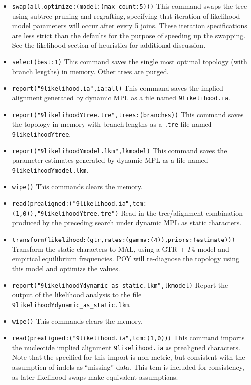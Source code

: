 \begin{itemize}
\item \texttt{swap(all,optimize:(model:(max\_count:5)))} This command swaps the tree using subtree pruning and 
regrafting, specifying that iteration of likelihood model parameters will occur after every 5 joins. These iteration 
specifications are less strict than the defaults for the purpose of speeding up the swapping. See the likelihood section
of heuristics for additional discussion. 
\item \texttt{select(best:1)} This command saves the single most optimal topology (with branch lengths) in 
memory. Other trees are purged.
\item \texttt{report("9likelihood.ia",ia:all)} This command saves the implied
    alignment generated by dynamic MPL as a file named \texttt{9likelihood.ia}.
\item \texttt{report("9likelihoodYtree.tre",trees:(branches))} This command saves the topology in memory with 
branch lengths as a \texttt{.tre} file named \texttt{9likelihoodYtree}.
\item \texttt{report("9likelihoodYmodel.lkm",lkmodel)} This command saves the parameter estimates generated 
by dynamic MPL as a file named \texttt{9likelihoodYmodel.lkm}.
\item \texttt{wipe()} This commands clears the memory.
\item \texttt{read(prealigned:("9likelihood.ia",tcm:(1,0)),"9likelihoodYtree.tre")} Read in the tree/alignment 
combination produced by the preceding search under dynamic MPL as static characters.
\item \texttt{transform(likelihood:(gtr,rates:(gamma:(4)),priors:(estimate)))} Transform the static characters to MAL, 
using a GTR + $\Gamma 4$ model and empirical equilibrium frequencies. POY will re-diagnose the topology 
using this model and optimize the values.
\item \texttt{report("9likelihoodYdynamic\_as\_static.lkm",lkmodel)} Report the output of the likelihood analysis to
 the file \texttt{9likelihoodYdynamic\_as\_static.lkm}.
\item \texttt{wipe()} This commands clears the memory.
\item \texttt{read(prealigned:("9likelihood.ia",tcm:(1,0)))} This command
    imports the nucleotide implied alignment \texttt{9likelihood.ia} as prealigned characters. Note that the 
     specified for this import is non-metric, but consistent with the assumption of indels as 
    ``missing'' data. This tcm is included for consistency, as later likelihood swaps make equivalent assumptions.

\end{itemize}
